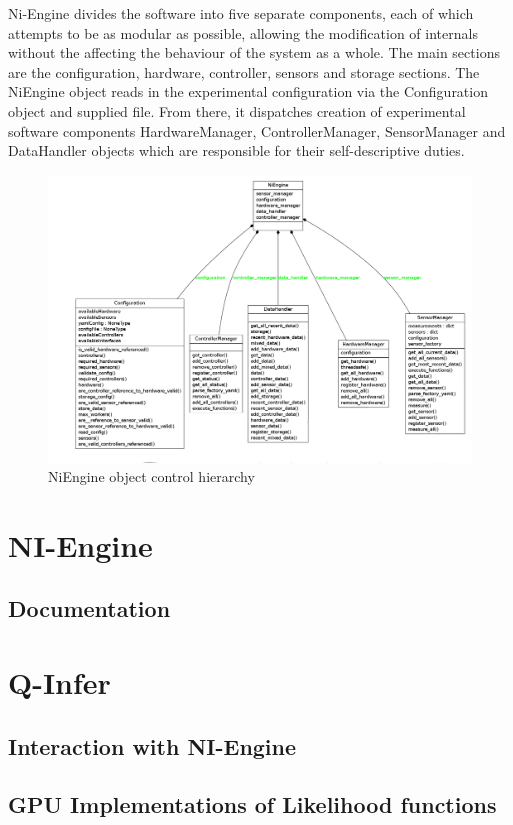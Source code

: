 Ni-Engine divides the software into five separate components, each of which attempts to be as modular as possible, allowing the modification of internals without the affecting the behaviour of the system as a whole. The main sections are the configuration, hardware, controller, sensors and storage sections. The NiEngine object reads in the experimental configuration via the Configuration object and supplied file. From there, it dispatches creation of experimental software components HardwareManager, ControllerManager, SensorManager and DataHandler objects which are responsible for their self-descriptive duties.

\begin{figure}[ht!]
\centering
\includegraphics[width=\textwidth]{Figures/NiEngine.png}
\caption{NiEngine object control hierarchy}
\label{fig:NiEngine}
\end{figure}
\section{NI-Engine}
\subsection{Documentation}
\section{Q-Infer}
\subsection{Interaction with NI-Engine}
\subsection{GPU Implementations of Likelihood functions}


